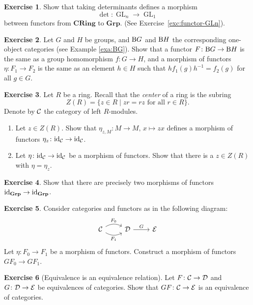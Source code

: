 \documentclass[11pt]{amsbook}
\DeclareMathOperator\GL{GL}
\def\cE{{\mathcal{E}}} \def\cG{{\mathcal{G}}} \def\cH{{\mathcal{H}}}
\def\id{{\rm id}}
\def\Grp{\mathbf{Grp}}
\def\CRing{\mathbf{CRing}}
\theoremstyle{plain}
\theoremstyle{definition}
\newtheorem{exercise}{Exercise}
\begin{document}
\begin{exercise}
Show that taking determinants defines a morphism 
\[
	\det\colon\!\GL_n \to \GL_1
\]
between functors from $\CRing$ to $\Grp$. (See Exercise~\ref{exc:functor-GLn}).
\end{exercise}


\begin{exercise}
Let $G$ and $H$ be groups, and ${\mathrm B} G$ and ${\mathrm B} H$ the corresponding one-object categories (see Example \ref{exa:BG}). Show that a functor $F\colon {\mathrm B} G \to {\mathrm B} H$ is the same as a group homomorphism $f\colon G\to H$, and a morphism of functors $\eta\colon F_1 \to F_2$ is the same as an element $h\in H$ such that $h f_1(g) h^{-1} = f_2(g)$ for all $g\in G$.
\end{exercise}


\begin{exercise}
Let $R$ be a ring. Recall that the \emph{center} of a ring is the subring
\[
	Z(R) = \{ z \in R \mid zr=rz \text{ for all $r \in R$} \}.
\]
Denote by ${\mathcal{C}}$ the category of left $R$-modules.
\begin{enumerate}
\item Let $z\in Z(R)$. Show that $\eta_{z,M} \colon M \to M,\, x \mapsto zx$ defines a morphism of functors $\eta_z\colon \id_\cC \to \id_\cC$.
\item Let $\eta \colon \id_\cC \to \id_\cC$ be a morphism of functors. Show that there is a $z\in Z(R)$ with $\eta = \eta_z$.
\end{enumerate}
\end{exercise}

\begin{exercise}
Show that there are precisely two morphisms of functors $\id_\Grp \to \id_\Grp$.  
\end{exercise}

\begin{exercise}
Consider categories and functors as in the following diagram:
\[
\begin{tikzcd}
\cC \arrow[bend left]{r}{F_0} \arrow[bend right,swap]{r}{F_1} & \cD \arrow{r}{G} & \cE
\end{tikzcd}
\]
Let $\eta\colon F_0 \to F_1$ be a morphism of functors. Construct a morphism of functors $GF_0 \to GF_1$.
\end{exercise}

\begin{exercise}[Equivalence is an equivalence relation]
Let $F\colon {\mathcal{C}} \to {\mathcal{D}}$ and $G\colon \cD\to \cE$ be equivalences of categories. Show that $GF\colon \cC \to \cE$ is an equivalence of categories.\end{exercise}
\end{document}
